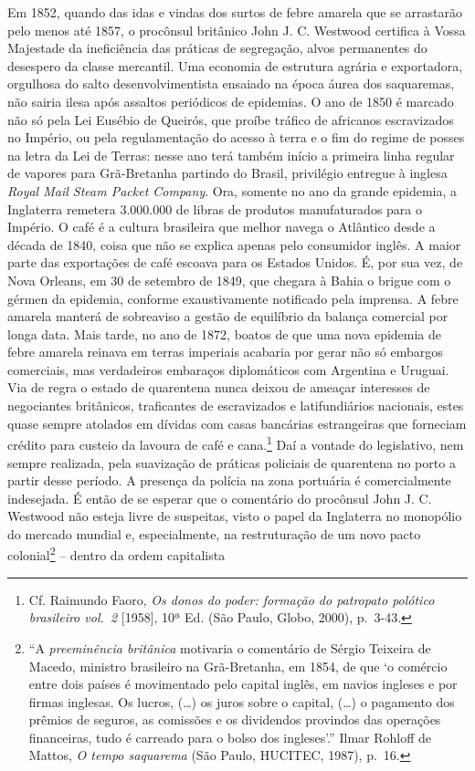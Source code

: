 Em 1852, quando das idas e vindas dos surtos de febre amarela que se
arrastarão pelo menos até 1857, o procônsul britânico John J. C.
Westwood certifica à Vossa Majestade da ineficiência das práticas de
segregação, alvos permanentes do desespero da classe mercantil. Uma
economia de estrutura agrária e exportadora, orgulhosa do salto
desenvolvimentista ensaiado na época áurea dos saquaremas, não sairia
ilesa após assaltos periódicos de epidemias. O ano de 1850 é marcado não
só pela Lei Eusébio de Queirós, que proíbe tráfico de africanos
escravizados no Império, ou pela regulamentação do acesso à terra e o
fim do regime de posses na letra da Lei de Terras: nesse ano terá também
início a primeira linha regular de vapores para Grã-Bretanha partindo do
Brasil, privilégio entregue à inglesa \emph{Royal Mail Steam Packet
Company}. Ora, somente no ano da grande epidemia, a Inglaterra remetera
3.000.000 de libras de produtos manufaturados para o Império. O café é a
cultura brasileira que melhor navega o Atlântico desde a década de 1840,
coisa que não se explica apenas pelo consumidor inglês. A maior parte
das exportações de café escoava para os Estados Unidos. É, por sua vez,
de Nova Orleans, em 30 de setembro de 1849, que chegara à Bahia o brigue
com o gérmen da epidemia, conforme exaustivamente notificado pela
imprensa. A febre amarela manterá de sobreaviso a gestão de equilíbrio
da balança comercial por longa data. Mais tarde, no ano de 1872, boatos
de que uma nova epidemia de febre amarela reinava em terras imperiais
acabaria por gerar não só embargos comerciais, mas verdadeiros embaraços
diplomáticos com Argentina e Uruguai. Via de regra o estado de
quarentena nunca deixou de ameaçar interesses de negociantes britânicos,
traficantes de escravizados e latifundiários nacionais, estes quase
sempre atolados em dívidas com casas bancárias estrangeiras que
forneciam crédito para custeio da lavoura de café e cana.\footnote{Cf.
  Raimundo Faoro, \emph{Os donos do poder: formação do patropato
  polótico brasileiro vol.~2} {[}1958{]}, 10ª Ed. (São Paulo, Globo,
  2000), p.~3-43.} Daí a vontade do legislativo, nem sempre realizada,
pela suavização de práticas policiais de quarentena no porto a partir
desse período. A presença da polícia na zona portuária é comercialmente
indesejada. É então de se esperar que o comentário do procônsul John J.
C. Westwood não esteja livre de suspeitas, visto o papel da Inglaterra
no monopólio do mercado mundial e, especialmente, na restruturação de um
novo pacto colonial\footnote{``A \emph{preeminência britânica} motivaria
  o comentário de Sérgio Teixeira de Macedo, ministro brasileiro na
  Grã-Bretanha, em 1854, de que `o comércio entre dois países é
  movimentado pelo capital inglês, em navios ingleses e por firmas
  inglesas. Os lucros, (\ldots{}) os juros sobre o capital, (\ldots{}) o
  pagamento dos prêmios de seguros, as comissões e os dividendos
  provindos das operações financeiras, tudo é carreado para o bolso dos
  ingleses'.'' Ilmar Rohloff de Mattos, \emph{O tempo saquarema} (São
  Paulo, HUCITEC, 1987), p.~16.} -- dentro da ordem capitalista
